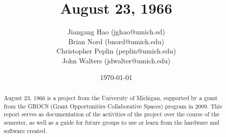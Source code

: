\documentclass[11pt]{report}
\date{\today}
\begin{document}
\title{August 23, 1966}
\author{
        Jiangang Hao (jghao@umich.ed) \\
        Brian Nord (bnord@umich.edu) \\
        Christopher Peplin (peplin@umich.edu) \\
        John Walters (jdwalter@umich.edu)
}
\maketitle

\begin{abstract}\centering
August 23, 1966 is a project from the University of Michigan, supported by a
grant from the GROCS (Grant Opportunities Collaborative Spaces) program in 2009.
This report serves as documentation of the activities of the project over the
course of the semester, as well as a guide for future groups to use or learn
from the hardware and software created.
\end{abstract}

\tableofcontents







\end{document}

